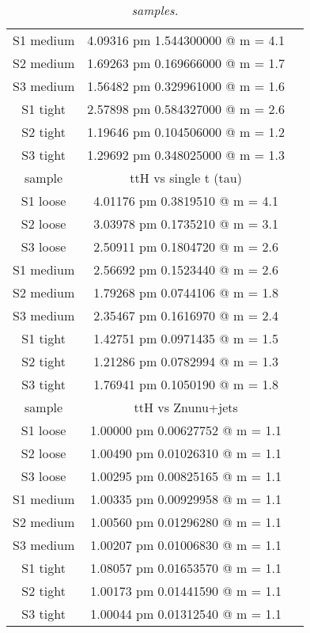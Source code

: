\documentclass[12pt,a4paper,twoside,english]{report}
\begin{document}
\begin{table}[h!]
\begin{tabular}{||c|c|c||}
    S1 medium & 4.09316 pm 1.544300000 @ m = 4.1\\
    S2 medium & 1.69263 pm 0.169666000 @ m = 1.7\\
    S3 medium & 1.56482 pm 0.329961000 @ m = 1.6\\
    S1 tight  & 2.57898 pm 0.584327000 @ m = 2.6\\
    S2 tight  & 1.19646 pm 0.104506000 @ m = 1.2\\
    S3 tight  & 1.29692 pm 0.348025000 @ m = 1.3\\
    \hline
    \hline
    sample & ttH vs single t (tau)\\
    \hline
    S1 loose  & 4.01176 pm 0.3819510 @ m = 4.1\\
    S2 loose  & 3.03978 pm 0.1735210 @ m = 3.1\\ 
    S3 loose  & 2.50911 pm 0.1804720 @ m = 2.6\\
    S1 medium & 2.56692 pm 0.1523440 @ m = 2.6\\
    S2 medium & 1.79268 pm 0.0744106 @ m = 1.8\\
    S3 medium & 2.35467 pm 0.1616970 @ m = 2.4\\
    S1 tight  & 1.42751 pm 0.0971435 @ m = 1.5\\
    S2 tight  & 1.21286 pm 0.0782994 @ m = 1.3\\
    S3 tight  & 1.76941 pm 0.1050190 @ m = 1.8\\
    \hline
    \hline
    sample & ttH vs Znunu+jets\\
    \hline
    S1 loose  & 1.00000 pm 0.00627752 @ m = 1.1\\
    S2 loose  & 1.00490 pm 0.01026310 @ m = 1.1\\ 
    S3 loose  & 1.00295 pm 0.00825165 @ m = 1.1\\
    S1 medium & 1.00335 pm 0.00929958 @ m = 1.1\\
    S2 medium & 1.00560 pm 0.01296280 @ m = 1.1\\
    S3 medium & 1.00207 pm 0.01006830 @ m = 1.1\\
    S1 tight  & 1.08057 pm 0.01653570 @ m = 1.1\\
    S2 tight  & 1.00173 pm 0.01441590 @ m = 1.1\\
    S3 tight  & 1.00044 pm 0.01312540 @ m = 1.1\\
    \hline
    \hline
  \end{tabular}
  \center\caption{\footnotesize{\em samples.}}
  \label{t:ttjets_sample}
\end{table}
\end{document}
